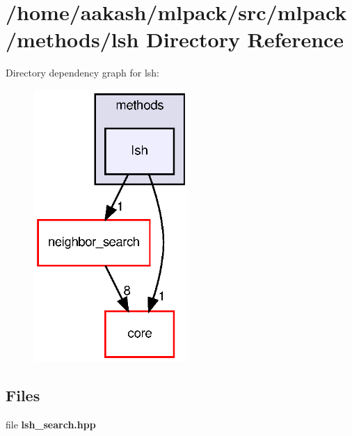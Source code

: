 \section{/home/aakash/mlpack/src/mlpack/methods/lsh Directory Reference}
\label{dir_390ed077ccb355ad25c9ee120c185888}
Directory dependency graph for lsh\+:
\nopagebreak
\begin{figure}[H]
\begin{center}
\leavevmode
\includegraphics[width=167pt]{dir_390ed077ccb355ad25c9ee120c185888_dep}
\end{center}
\end{figure}
\subsection*{Files}
\begin{DoxyCompactItemize}
\item 
file \textbf{ lsh\+\_\+search.\+hpp}
\end{DoxyCompactItemize}
